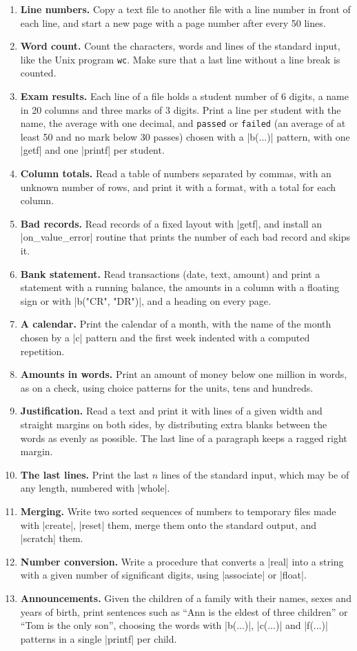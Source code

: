 \begin{enumerate}
\item \textbf{Line numbers.} Copy a text file to another file with a
  line number in front of each line, and start a new page with a page
  number after every 50 lines.
\item \textbf{Word count.} Count the characters, words and lines of the
  standard input, like the Unix program \texttt{wc}. Make sure that a
  last line without a line break is counted.
\item \textbf{Exam results.} Each line of a file holds a student
  number of 6 digits, a name in 20 columns and three marks of 3 digits.
  Print a line per student with the name, the average with one decimal,
  and \texttt{passed} or \texttt{failed} (an average of at least 50 and no
  mark below 30 passes) chosen with a \code|b(...)| pattern, with one
  \code|getf| and one \code|printf| per student.
\item \textbf{Column totals.} Read a table of numbers separated by
  commas, with an unknown number of rows, and print it with a format,
  with a total for each column.
\item \textbf{Bad records.} Read records of a fixed layout with
  \code|getf|, and install an \code|on_value_error| routine that prints
  the number of each bad record and skips it.
\item \textbf{Bank statement.} Read transactions (date, text, amount) and
  print a statement with a running balance, the amounts in a column with
  a floating sign or with \code|b("CR", "DR")|, and a heading on every
  page.
\item \textbf{A calendar.} Print the calendar of a month, with the name
  of the month chosen by a \code|c| pattern and the first week indented
  with a computed repetition.
\item \textbf{Amounts in words.} Print an amount of money below one
  million in words, as on a check, using choice patterns for the units,
  tens and hundreds.
\item \textbf{Justification.} Read a text and print it with lines of a
  given width and straight margins on both sides, by distributing extra
  blanks between the words as evenly as possible. The last line of a
  paragraph keeps a ragged right margin.
\item \textbf{The last lines.} Print the last $n$ lines of the standard
  input, which may be of any length, numbered with \code|whole|.
\item \textbf{Merging.} Write two sorted sequences of numbers to
  temporary files made with \code|create|, \code|reset| them, merge them
  onto the standard output, and \code|scratch| them.
\item \textbf{Number conversion.} Write a procedure that converts a
  \code|real| into a string with a given number of significant digits,
  using \code|associate| or \code|float|.
\item \textbf{Announcements.} Given the children of a family with
  their names, sexes and years of birth, print sentences such as ``Ann is the
  eldest of three children'' or ``Tom is the only son'', choosing the
  words with \code|b(...)|, \code|c(...)| and \code|f(...)| patterns in a
  single \code|printf| per child.
\end{enumerate}
